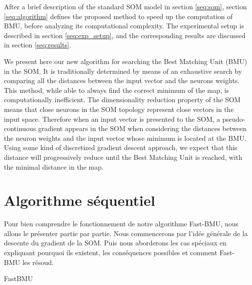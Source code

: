 	After a brief description of the standard SOM model in section \ref{seq:som}, section \ref{seq:algorithm} defines the proposed method to speed up the computation of BMU, before analyzing its computational complexity. The experimental setup is described in section \ref{seq:exp_setup}, 
	and the corresponding results are discussed in section \ref{seq:results}.

	We present here our new algorithm for searching the Best Matching Unit (BMU) in the SOM. It is traditionally determined by means of an exhaustive search by comparing all the distances between the input vector and the neurons weights. This method, while able to always find the correct minimum of the map, is computationally inefficient. The dimensionality reduction property of the SOM means that close neurons in the SOM topology represent close vectors in the input space. Therefore when an input vector is presented to the SOM, a pseudo-continuous gradient appears in the SOM when considering the distances between the neuron weights and the input vector whose minimum is located at the BMU. Using some kind of discretized gradient descent approach, we expect that this distance will progressively reduce until the Best Matching Unit is reached, with the minimal distance in the map. 

	\newpage

	\section{Algorithme séquentiel}

	Pour bien comprendre le fonctionnement de notre algorithme Fast-BMU, nous allons le présenter partie par partie. Nous commencerons par l'idée générale de la descente du gradient de la SOM. Puis nous aborderons les cas spéciaux en expliquant pourquoi ils existent, les conséquences possibles et comment Fast-BMU les résoud.

	\begin{algorithm}
	\caption{FastBMU}
	\label{fast:alg:bmu}
	\DontPrintSemicolon

	\end{algorithm}

